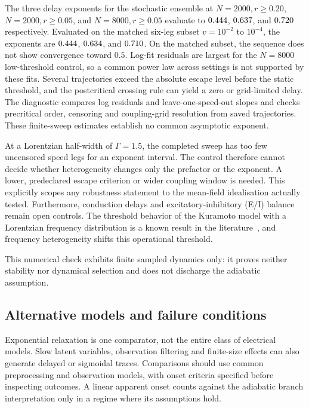 \documentclass{article}
\renewcommand{\cite}[1]{\citep{#1}}
\begin{document}
The three delay exponents for the stochastic ensemble at $N=2000, r\ge 0.20$, $N=2000, r\ge 0.05$, and $N=8000, r\ge 0.05$ evaluate to $0.444$, $0.637$, and $0.720$ respectively. Evaluated on the matched six-leg subset $v=10^{-2}$ to $10^{-4}$, the exponents are $0.444$, $0.634$, and $0.710$. On the matched subset, the sequence does not show convergence toward $0.5$. Log-fit residuals are largest for the $N=8000$ low-threshold control, so a common power law across settings is not supported by these fits. Several trajectories exceed the absolute escape level before the static threshold, and the postcritical crossing rule can yield a zero or grid-limited delay. The diagnostic compares log residuals and leave-one-speed-out slopes and checks precritical order, censoring and coupling-grid resolution from saved trajectories. These finite-sweep estimates establish no common asymptotic exponent.

At a Lorentzian half-width of $\Gamma=1.5$, the completed sweep has too few uncensored speed legs for an exponent interval. The control therefore cannot decide whether heterogeneity changes only the prefactor or the exponent. A lower, predeclared escape criterion or wider coupling window is needed. This explicitly scopes any robustness statement to the mean-field idealisation actually tested. Furthermore, conduction delays and excitatory-inhibitory (E/I) balance remain open controls. The threshold behavior of the Kuramoto model with a Lorentzian frequency distribution is a known result in the literature~\cite{acebron2005}, and frequency heterogeneity shifts this operational threshold.

This numerical check exhibits finite sampled dynamics only: it proves neither stability nor dynamical selection and does not discharge the adiabatic assumption.

\subsection{Alternative models and failure conditions}

Exponential relaxation is one comparator, not the entire class of electrical models. Slow latent variables, observation filtering and finite-size effects can also generate delayed or sigmoidal traces. Comparisons should use common preprocessing and observation models, with onset criteria specified before inspecting outcomes. A linear apparent onset counts against the adiabatic branch interpretation only in a regime where its assumptions hold.
\end{document}

